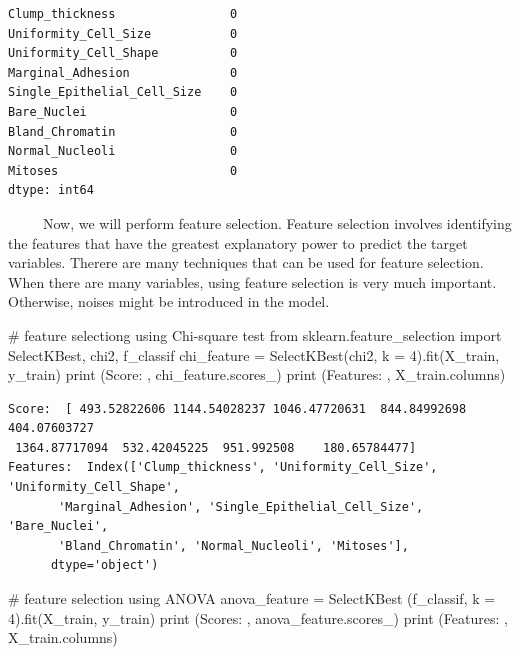 \documentclass[
  letterpaper,
  DIV=11,
  numbers=noendperiod]{scrreprt}
\newenvironment{Shaded}{\begin{snugshade}}{\end{snugshade}}
\newcommand{\BuiltInTok}[1]{\textcolor[rgb]{0.00,0.23,0.31}{#1}}
\newcommand{\CommentTok}[1]{\textcolor[rgb]{0.37,0.37,0.37}{#1}}
\newcommand{\DecValTok}[1]{\textcolor[rgb]{0.68,0.00,0.00}{#1}}
\newcommand{\ImportTok}[1]{\textcolor[rgb]{0.00,0.46,0.62}{#1}}
\newcommand{\NormalTok}[1]{\textcolor[rgb]{0.00,0.23,0.31}{#1}}
\newcommand{\OperatorTok}[1]{\textcolor[rgb]{0.37,0.37,0.37}{#1}}
\newcommand{\StringTok}[1]{\textcolor[rgb]{0.13,0.47,0.30}{#1}}
\begin{document}
\begin{verbatim}
Clump_thickness                0
Uniformity_Cell_Size           0
Uniformity_Cell_Shape          0
Marginal_Adhesion              0
Single_Epithelial_Cell_Size    0
Bare_Nuclei                    0
Bland_Chromatin                0
Normal_Nucleoli                0
Mitoses                        0
dtype: int64
\end{verbatim}

~~~~~Now, we will perform feature selection. Feature selection involves
identifying the features that have the greatest explanatory power to
predict the target variables. Therere are many techniques that can be
used for feature selection. When there are many variables, using feature
selection is very much important. Otherwise, noises might be introduced
in the model.

\begin{Shaded}
\begin{Highlighting}[]
\CommentTok{\# feature selectiong using Chi{-}square test }
\ImportTok{from}\NormalTok{ sklearn.feature\_selection }\ImportTok{import}\NormalTok{ SelectKBest, chi2, f\_classif}
\NormalTok{chi\_feature }\OperatorTok{=}\NormalTok{ SelectKBest(chi2, k }\OperatorTok{=} \DecValTok{4}\NormalTok{).fit(X\_train, y\_train)}
\BuiltInTok{print}\NormalTok{ (}\StringTok{\textquotesingle{}Score: \textquotesingle{}}\NormalTok{, chi\_feature.scores\_)}
\BuiltInTok{print}\NormalTok{ (}\StringTok{\textquotesingle{}Features: \textquotesingle{}}\NormalTok{, X\_train.columns)}
\end{Highlighting}
\end{Shaded}

\begin{verbatim}
Score:  [ 493.52822606 1144.54028237 1046.47720631  844.84992698  404.07603727
 1364.87717094  532.42045225  951.992508    180.65784477]
Features:  Index(['Clump_thickness', 'Uniformity_Cell_Size', 'Uniformity_Cell_Shape',
       'Marginal_Adhesion', 'Single_Epithelial_Cell_Size', 'Bare_Nuclei',
       'Bland_Chromatin', 'Normal_Nucleoli', 'Mitoses'],
      dtype='object')
\end{verbatim}

\begin{Shaded}
\begin{Highlighting}[]
\CommentTok{\# feature selection using ANOVA }
\NormalTok{anova\_feature }\OperatorTok{=}\NormalTok{ SelectKBest (f\_classif, k }\OperatorTok{=} \DecValTok{4}\NormalTok{).fit(X\_train, y\_train)}
\BuiltInTok{print}\NormalTok{ (}\StringTok{\textquotesingle{}Scores: \textquotesingle{}}\NormalTok{, anova\_feature.scores\_)}
\BuiltInTok{print}\NormalTok{ (}\StringTok{\textquotesingle{}Features: \textquotesingle{}}\NormalTok{, X\_train.columns)}
\end{Highlighting}
\end{Shaded}
\end{document}
